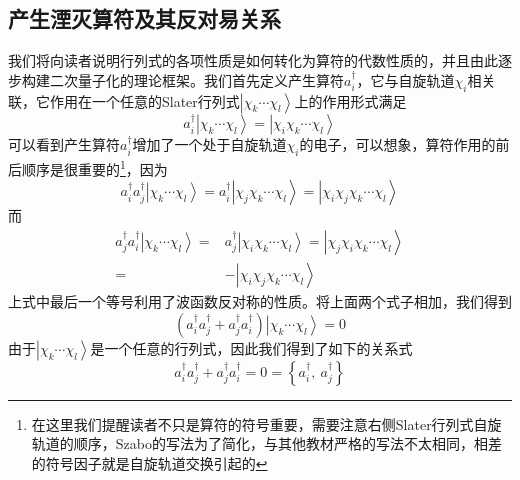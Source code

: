 \documentclass[12pt,a4paper,openany,twoside]{book}
\numberwithin{equation}{section}
\begin{document}
    \subsection{产生湮灭算符及其反对易关系} 
    我们将向读者说明行列式的各项性质是如何转化为算符的代数性质的，并且由此逐步构建二次量子化的理论框架。我们首先定义产生算符$a_i^{\dagger}$，它与自旋轨道$\chi_i$相关联，它作用在一个任意的Slater行列式$\left|\chi_k\cdots\chi_l\right\rangle$上的作用形式满足
    \begin{equation}
        a_i^{\dagger}\left|\chi_k\cdots\chi_l\right\rangle=\left|\chi_i\chi_k\cdots\chi_l\right\rangle
        \label{creation operator}
    \end{equation}
      可以看到产生算符$a_i^{\dagger}$增加了一个处于自旋轨道$\chi_i$的电子，可以想象，算符作用的前后顺序是很重要的\footnote{在这里我们提醒读者不只是算符的符号重要，需要注意右侧Slater行列式自旋轨道的顺序，Szabo的写法为了简化，与其他教材严格的写法不太相同，相差的符号因子就是自旋轨道交换引起的}，因为
      \begin{equation}
          a_i^{\dagger}a_j^{\dagger}\left|\chi_k\cdots\chi_l\right\rangle=a_i^{\dagger}
          \left|\chi_j\chi_k\cdots\chi_l\right\rangle=\left|\chi_i\chi_j\chi_k\cdots\chi_l\right\rangle
      \end{equation}
      而
      \begin{equation}
          \begin{aligned}
              a_j^{\dagger}a_i^{\dagger}\left|\chi_k\cdots\chi_l\right\rangle=&a_j^{\dagger}
              \left|\chi_i\chi_k\cdots\chi_l\right\rangle=\left|\chi_j\chi_i\chi_k\cdots\chi_l\right\rangle\\
              =&-\left|\chi_i\chi_j\chi_k\cdots\chi_l\right\rangle
          \end{aligned}
      \end{equation}
      上式中最后一个等号利用了波函数反对称的性质。将上面两个式子相加，我们得到
      \begin{equation}
          \left(a_i^{\dagger}a_j^{\dagger}+a_j^{\dagger}a_i^{\dagger}\right)
          \left|\chi_k\cdots\chi_l\right\rangle=0
      \end{equation}
      由于$\left|\chi_k\cdots\chi_l\right\rangle$是一个任意的行列式，因此我们得到了如下的关系式
      \begin{equation}
          a_i^{\dagger}a_j^{\dagger}+a_j^{\dagger}a_i^{\dagger}=0=\left\{a_i^{\dagger},\ a_j^{\dagger}\right\}
          \label{anti commutator creation}
      \end{equation}
\end{document}
